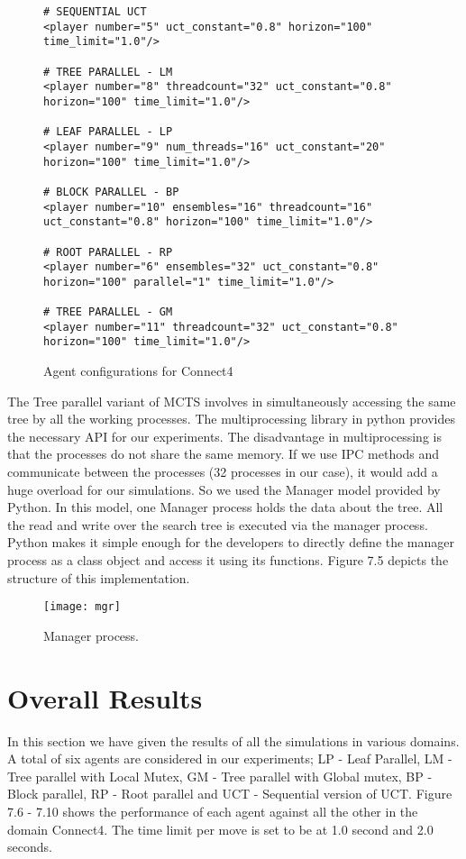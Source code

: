 \documentclass[double,12pt]{beavtex}
\begin{document}
\begin{figure}[!ht]
\begin{lstlisting}
# SEQUENTIAL UCT
<player number="5" uct_constant="0.8" horizon="100" time_limit="1.0"/>

# TREE PARALLEL - LM
<player number="8" threadcount="32" uct_constant="0.8" horizon="100" time_limit="1.0"/>

# LEAF PARALLEL - LP
<player number="9" num_threads="16" uct_constant="20" horizon="100" time_limit="1.0"/>

# BLOCK PARALLEL - BP
<player number="10" ensembles="16" threadcount="16" uct_constant="0.8" horizon="100" time_limit="1.0"/>

# ROOT PARALLEL - RP
<player number="6" ensembles="32" uct_constant="0.8" horizon="100" parallel="1" time_limit="1.0"/>

# TREE PARALLEL - GM
<player number="11" threadcount="32" uct_constant="0.8" horizon="100" time_limit="1.0"/>
\end{lstlisting}
\caption{Agent configurations for Connect4}
\end{figure}


The Tree parallel variant of MCTS involves in simultaneously accessing the same tree by all the working processes. The multiprocessing library in python provides the necessary API for our experiments. The disadvantage in multiprocessing is that the processes do not share the same memory. If we use IPC methods and communicate between the processes (32 processes in our case), it would add a huge overload for our simulations. So we used the Manager model provided by Python. In this model, one Manager process holds the data about the tree. All the read and write over the search tree is executed via the manager process. Python makes it simple enough for the developers to directly define the manager process as a class object and access it using its functions. Figure 7.5 depicts the structure of this implementation.

\begin{figure}[h!]
\centering
\texttt{[image: mgr]}
\caption{Manager process.}
\end{figure}

\section{Overall Results}
In this section we have given the results of all the simulations in various domains. A total of six agents are considered in our experiments; LP - Leaf Parallel, LM - Tree parallel with Local Mutex, GM - Tree parallel with Global mutex, BP - Block parallel, RP - Root parallel and UCT - Sequential version of UCT. Figure 7.6 - 7.10 shows the performance of each agent against all the other in the domain Connect4. The time limit per move is set to be at 1.0 second and 2.0 seconds. 
\end{document}
